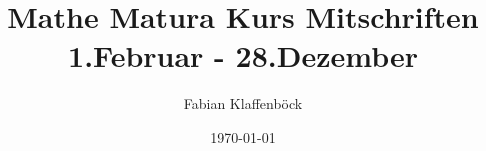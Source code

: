 \documentclass[12pt]{article}
\title{Mathe Matura Kurs Mitschriften 
\break 1.Februar - 28.Dezember}
\author{Fabian Klaffenböck}
\date{\today}
\begin{document}


\begin{titlepage}
    \maketitle
\end{titlepage}


\break

\break

\break

\break

\break

\break

\break

\break

\break

\break

\break

\break

\break

\break

\break

\break

\break

\break

\break

\break

\break

\end{document}

